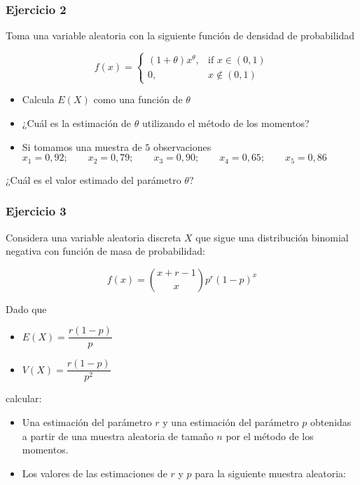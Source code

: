\documentclass[
]{book}
\providecommand{\tightlist}{%
  \setlength{\itemsep}{0pt}\setlength{\parskip}{0pt}}
\begin{document}
\hypertarget{ejercicio-2-10}{%
\subsubsection{Ejercicio 2}\label{ejercicio-2-10}}

Toma una variable aleatoria con la siguiente función de densidad de probabilidad

\[
f(x)=
\begin{cases}
    (1+\theta)x^\theta,& \text{if } x\in (0,1)\\
    0,& x\notin (0,1)
\end{cases}
\]

\begin{itemize}
\tightlist
\item
  Calcula \(E(X)\) como una función de \(\theta\)
\item
  ¿Cuál es la estimación de \(\theta\) utilizando el método de los momentos?
\item
  Si tomamos una muestra de \(5\) observaciones
  \(x_1 = 0,92; \qquad x_2 = 0,79; \qquad x_3 = 0,90; \qquad x_4 = 0,65; \qquad x_5 = 0,86\)
\end{itemize}

¿Cuál es el valor estimado del parámetro \(\theta\)?

\hypertarget{ejercicio-3-7}{%
\subsubsection{Ejercicio 3}\label{ejercicio-3-7}}

Considera una variable aleatoria discreta \(X\) que sigue una distribución binomial negativa con función de masa de probabilidad:

\[f(x) = \binom{x+r-1}{x}p^r(1-p)^x\]

Dado que

\begin{itemize}
\tightlist
\item
  \(E(X)=\dfrac{r(1-p)}{p}\)
\item
  \(V(X) =\dfrac{r(1-p)}{p^2}\)
\end{itemize}

calcular:

\begin{itemize}
\item
  Una estimación del parámetro \(r\) y una estimación del parámetro \(p\) obtenidas a partir de una muestra aleatoria de tamaño \(n\) por el método de los momentos.
\item
  Los valores de las estimaciones de \(r\) y \(p\) para la siguiente muestra aleatoria:
\end{itemize}
\end{document}

